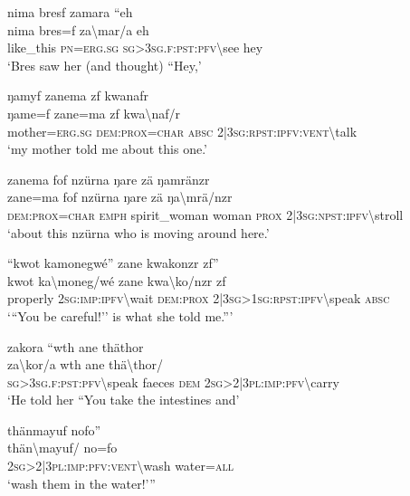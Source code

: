 \ea\label{ex:8:a1698}
nima bresf zamara ``eh\\
\gll nima	bres=f	za{\textbackslash}mar/a	eh\\
     like\_this	\textsc{pn}=\textsc{erg}.\textsc{sg}	\textsc{sg}>3\textsc{sg}.\textsc{f}:\textsc{pst}:\textsc{pfv}{\textbackslash}see	hey\\
\glt `Bres saw her (and thought) ``Hey,'
\z

\ea\label{ex:8:a1699}
ŋamyf zanema zf kwanafr\\
\gll ŋame=f	zane=ma	zf	kwa{\textbackslash}naf/r\\
     mother=\textsc{erg}.\textsc{sg}	\textsc{dem}:\textsc{prox}=\textsc{char}	\textsc{absc}	2|3\textsc{sg}:\textsc{rpst}:\textsc{ipfv}:\textsc{vent}{\textbackslash}talk\\
\glt `my mother told me about this one.'
\z

\ea\label{ex:8:a1700}
zanema fof nzürna ŋare zä ŋamränzr\\
\gll zane=ma	fof	nzürna	ŋare	zä	ŋa{\textbackslash}mrä/nzr\\
     \textsc{dem}:\textsc{prox}=\textsc{char}	\textsc{emph}	spirit\_woman	woman	\textsc{prox}	2|3\textsc{sg}:\textsc{npst}:\textsc{ipfv}{\textbackslash}stroll\\
\glt `about this nzürna who is moving around here.'
\z

\ea\label{ex:8:a1702}
``kwot kamonegwé'' zane kwakonzr zf''\\
\gll kwot	ka{\textbackslash}moneg/wé	zane	kwa{\textbackslash}ko/nzr	zf\\
     properly	2\textsc{sg}:\textsc{imp}:\textsc{ipfv}{\textbackslash}wait	\textsc{dem}:\textsc{prox}	2|3\textsc{sg}>1\textsc{sg}:\textsc{rpst}:\textsc{ipfv}{\textbackslash}speak	\textsc{absc}\\
\glt `{``}You be careful!'' is what she told me.'''
\z

\ea\label{ex:8:a1704}
zakora ``wth ane thäthor\\
\gll za{\textbackslash}kor/a	wth	ane	thä{\textbackslash}thor/\\
     \textsc{sg}>3\textsc{sg}.\textsc{f}:\textsc{pst}:\textsc{pfv}{\textbackslash}speak	faeces	\textsc{dem}	2\textsc{sg}>2|3\textsc{pl}:\textsc{imp}:\textsc{pfv}{\textbackslash}carry\\
\glt `He told her ``You take the intestines and'
\z

\ea\label{ex:8:a1705}
thänmayuf nofo''\\
\gll thän{\textbackslash}mayuf/	no=fo\\
     2\textsc{sg}>2|3\textsc{pl}:\textsc{imp}:\textsc{pfv}:\textsc{vent}{\textbackslash}wash	water=\textsc{all}\\
\glt `wash them in the water!'''
\z

